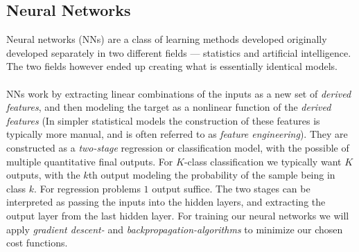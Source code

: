\documentclass[10pt, a4paper, twocolumn]{article}
\begin{document}
	\subsection{Neural Networks}
		Neural networks (NNs) are a class of learning methods developed originally developed separately in two different fields --- statistics and artificial intelligence. The two fields however ended up creating what is essentially identical models\cite{ElementsOfStatLearning}.\\\\
		NNs work by extracting linear combinations of the inputs as a new set of \emph{derived features}, and then modeling the target as a nonlinear function of the \emph{derived features} (In simpler statistical models the construction of these features is typically more manual, and is often referred to as \emph{feature engineering}). They are constructed as a \emph{two-stage} regression or classification model, with the possible of multiple quantitative final outputs. For $K$-class classification we typically want $K$ outputs, with the $k$th output modeling the probability of the sample being in class $k$. For regression problems $1$ output suffice. The two stages can be interpreted as passing the inputs into the hidden layers, and extracting the output layer from the last hidden layer.
		For training our neural networks we will apply \emph{gradient descent-} and \emph{backpropagation-algorithms} to minimize our chosen cost functions. 
\end{document}
